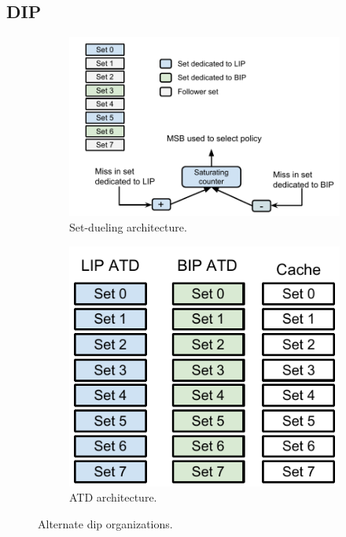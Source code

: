 \subsection{DIP}
\label{sec:algorithms:dip}

\begin{figure}[t]
    \centering
    \begin{subfigure}[b]{0.50\textwidth}
        \includegraphics[width=\textwidth]{figures/algorithms/DIP_architecture}
        \caption{Set-dueling architecture.}
        \label{fig:algorithms:dip:set_dueling}
    \end{subfigure}    
    \begin{subfigure}[b]{0.45\textwidth}
        \includegraphics[width=.9\textwidth]{figures/algorithms/DIP_atd_architecture}
        \caption{ATD architecture.}
        \label{fig:algorithms:dip:atd}
    \end{subfigure}
    \caption{Alternate \gls{dip} organizations.}
\end{figure}

